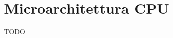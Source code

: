 \documentclass[../ace.tex]{subfiles}
\begin{document}
\section{Microarchitettura CPU}
TODO
\end{document}
